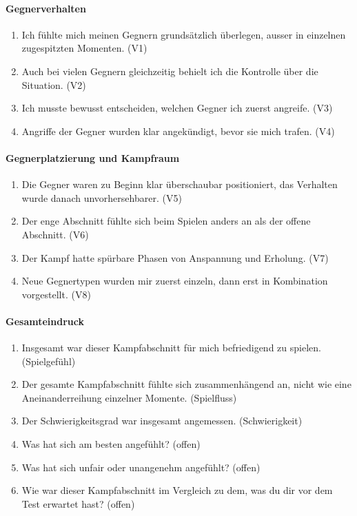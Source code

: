 \documentclass[../Main.tex]{subfiles}
\begin{document}
\paragraph{Gegnerverhalten}
\begin{enumerate}[label=\textbf{Q\arabic*}, leftmargin=1.5cm, itemsep=0.5em]
    \item Ich fühlte mich meinen Gegnern grundsätzlich überlegen, ausser in einzelnen zugespitzten Momenten. \hfill (V1)
    \item Auch bei vielen Gegnern gleichzeitig behielt ich die Kontrolle über die Situation. \hfill (V2)
    \item Ich musste bewusst entscheiden, welchen Gegner ich zuerst angreife. \hfill (V3)
    \item Angriffe der Gegner wurden klar angekündigt, bevor sie mich trafen. \hfill (V4)
\end{enumerate}

\paragraph{Gegnerplatzierung und Kampfraum}
\begin{enumerate}[label=\textbf{Q\arabic*}, leftmargin=1.5cm, itemsep=0.5em, resume]
    \item Die Gegner waren zu Beginn klar überschaubar positioniert, das Verhalten wurde danach unvorhersehbarer. \hfill (V5)
    \item Der enge Abschnitt fühlte sich beim Spielen anders an als der offene Abschnitt. \hfill (V6)
    \item Der Kampf hatte spürbare Phasen von Anspannung und Erholung. \hfill (V7)
    \item Neue Gegnertypen wurden mir zuerst einzeln, dann erst in Kombination vorgestellt. \hfill (V8)
\end{enumerate}

\paragraph{Gesamteindruck}
\begin{enumerate}[label=\textbf{Q\arabic*}, leftmargin=1.5cm, itemsep=0.5em, resume]
    \item Insgesamt war dieser Kampfabschnitt für mich befriedigend zu spielen. \hfill (Spielgefühl)
    \item Der gesamte Kampfabschnitt fühlte sich zusammenhängend an, nicht wie eine Aneinanderreihung einzelner Momente. \hfill (Spielfluss)
    \item Der Schwierigkeitsgrad war insgesamt angemessen. \hfill (Schwierigkeit)
    \item Was hat sich am besten angefühlt? \hfill (offen)
    \item Was hat sich unfair oder unangenehm angefühlt? \hfill (offen)
    \item Wie war dieser Kampfabschnitt im Vergleich zu dem, was du dir vor dem Test erwartet hast? \hfill (offen)
\end{enumerate}
\end{document}
